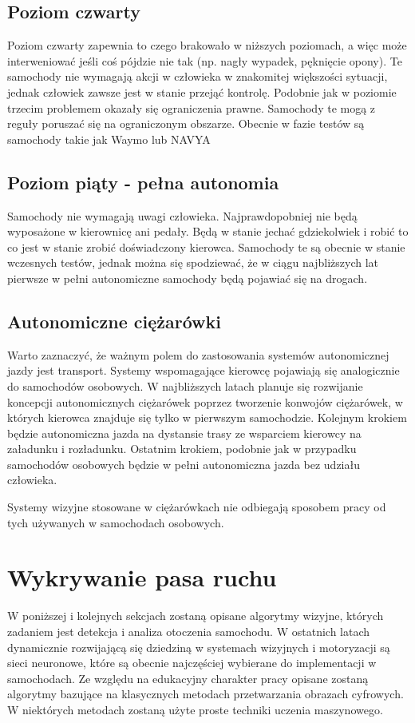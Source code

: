 \subsection{Poziom czwarty}
Poziom czwarty zapewnia to czego brakowało w niższych poziomach, a więc może interweniować jeśli coś pójdzie nie tak (np. nagły wypadek, pęknięcie opony). Te samochody nie wymagają akcji w człowieka w znakomitej większości sytuacji, jednak człowiek zawsze jest w stanie przejąć kontrolę. Podobnie jak w poziomie trzecim problemem okazały się ograniczenia prawne. Samochody te mogą z reguły poruszać się na ograniczonym obszarze. Obecnie w fazie testów są samochody takie jak Waymo lub NAVYA

\subsection{Poziom piąty - pełna autonomia}
Samochody nie wymagają uwagi człowieka. Najprawdopobniej nie będą wyposażone w kierownicę ani pedały. Będą w stanie jechać gdziekolwiek i robić to co jest w stanie zrobić doświadczony kierowca. Samochody te są obecnie w stanie wczesnych testów, jednak można się spodziewać, że w ciągu najbliższych lat pierwsze w pełni autonomiczne samochody będą pojawiać się na drogach.

\subsection{Autonomiczne ciężarówki}
Warto zaznaczyć, że ważnym polem do zastosowania systemów autonomicznej jazdy jest transport. Systemy wspomagające kierowcę pojawiają się analogicznie do samochodów osobowych. W najbliższych latach planuje się rozwijanie koncepcji autonomicznych ciężarówek poprzez tworzenie konwojów ciężarówek, w których kierowca znajduje się tylko w pierwszym samochodzie. Kolejnym krokiem będzie autonomiczna jazda na dystansie trasy ze wsparciem kierowcy na załadunku i rozładunku. Ostatnim krokiem, podobnie jak w przypadku samochodów osobowych będzie w pełni autonomiczna jazda bez udziału człowieka.

Systemy wizyjne stosowane w ciężarówkach nie odbiegają sposobem pracy od tych używanych w samochodach osobowych.

\section{Wykrywanie pasa ruchu}
\label{sec:lane_detection}
W poniższej i kolejnych sekcjach zostaną opisane algorytmy wizyjne, których zadaniem jest detekcja i analiza otoczenia samochodu. W ostatnich latach dynamicznie rozwijającą się dziedziną w systemach wizyjnych i motoryzacji są sieci neuronowe, które są obecnie najczęściej wybierane do implementacji w samochodach. Ze względu na edukacyjny charakter pracy opisane zostaną algorytmy bazujące na klasycznych metodach przetwarzania obrazach cyfrowych. W niektórych metodach zostaną użyte proste techniki uczenia maszynowego.

